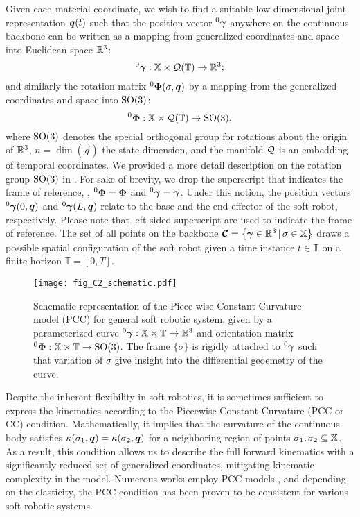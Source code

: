 {Given each material coordinate, we wish to find a suitable low-dimensional joint representation ${\boldsymbol{q}}(t)$ such that the position vector $^0{\boldsymbol{\gamma}}$ anywhere on the continuous backbone can be written as a mapping from generalized coordinates and space into Euclidean space $\mathbb{R}^3$:
%
\begin{equation}
^0{\boldsymbol{\gamma}}: \mathbb{X} \times \mathcal{Q}(\mathbb{T}) \to \mathbb{R}^3;
\end{equation}
%
and similarly the rotation matrix $^0\boldsymbol{\Phi}(\sigma,\boldsymbol{q})$ by a mapping from the generalized coordinates and space into $\textup{\textrm{SO}}(3)$:
%
\begin{equation}
^0{\boldsymbol{\Phi}}: \mathbb{X} \times \mathcal{Q}(\mathbb{T}) \to \textup{\textrm{SO}}(3), \label{eq:phi_map}
\end{equation}
%
where {$\textup{\textrm{SO}}(3)$ denotes the special orthogonal group for rotations about the origin of $\mathbb{R}^3$}, $n = \dim(\vec{q})$ the state dimension, and the manifold $\mathcal{Q}$ is an embedding of temporal coordinates. We provided a more detail description on the rotation group $\textup{\textrm{SO}}(3)$ in . For sake of brevity, we drop the superscript that indicates the frame of reference, \ie, $^0{\boldsymbol{\Phi}} = {\boldsymbol{\Phi}}$ and $^0{\boldsymbol{\gamma}} = {\boldsymbol{\gamma}}$. Under this notion, the position vectors $^0{\boldsymbol{\gamma}}(0,{\boldsymbol{q}})$ and
$^0{\boldsymbol{\gamma}}(L,{\boldsymbol{q}})$ relate to the base and the end-effector of the soft robot, respectively. {Please note that left-sided superscript are used to indicate the frame of reference.} The set of all points on the backbone
$\boldsymbol{\mathcal{C}} = \left\{{\boldsymbol{\gamma}} \in \mathbb{R}^3\, |\, \sigma \in \mathbb{X} \right\}$ draws a possible {spatial} configuration of the soft robot given {a time instance $t \in \mathbb{T}$ on a finite horizon $\mathbb{T} = [0,T]$}.
%
\begin{figure}[!t]
  \vspace{-0.6mm}
  \centering
   \texttt{[image: fig\_C2\_schematic.pdf]}
  \caption{Schematic representation of the Piece-wise Constant Curvature model (PCC) for general soft robotic system, given by a parameterized curve $^0 {\boldsymbol{\gamma}}: \mathbb{X} \times \mathbb{T} \to \mathbb{R}^3$ and orientation matrix $^0 {\boldsymbol{\Phi}}: \mathbb{X} \times \mathbb{T} \to \textup{\textrm{SO}}(3)$. The frame $\{\sigma\}$ is rigidly attached to $^0 {\boldsymbol{\gamma}}$ such that variation of $\sigma$ give insight into the differential geoemetry of the curve.}
  \label{fig:C2:configuration}
\end{figure}
%
\begin{dfn}
Despite the inherent flexibility in soft robotics, it is sometimes sufficient to express the kinematics according to the Piecewise Constant Curvature (PCC or CC) condition. Mathematically, it implies that the curvature of the continuous body satisfies $\kappa(\sigma_1,{\boldsymbol{q}}) = \kappa(\sigma_2,{\boldsymbol{q}})$ for a neighboring region of points $\sigma_1,\sigma_2 \subseteq \mathbb{X}$. As a result, this condition allows us to describe the full forward kinematics with a significantly reduced set of generalized coordinates, mitigating kinematic complexity in the model. Numerous works employ PCC models \cite{Falkenhahn2015,Katzschmann2019,Tatlicioglu2007,Marchese2016,Godage2016,DellaSantina2020a}, and depending on the elasticity, the PCC condition has been proven to be consistent for various soft robotic systems.

\end{dfn}}
